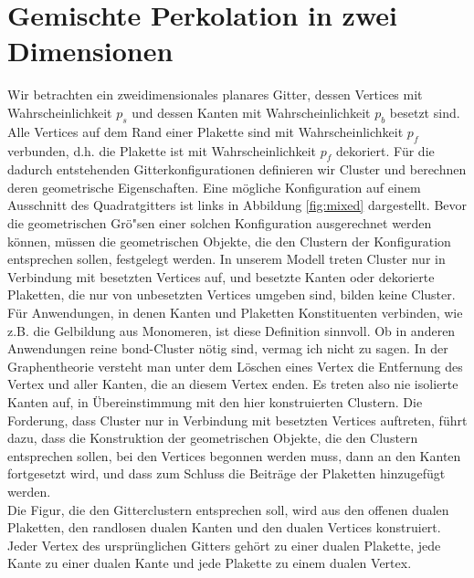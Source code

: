 \section{Gemischte Perkolation in zwei Dimensionen}
\label{sec:2dmixed}
Wir betrachten ein zweidimensionales planares Gitter, dessen Vertices mit Wahrscheinlichkeit $p_s$ und dessen Kanten mit Wahrscheinlichkeit $p_b$ besetzt sind. Alle Vertices auf dem Rand einer Plakette sind mit Wahrscheinlichkeit $p_f$ verbunden, d.h. die Plakette ist mit Wahrscheinlichkeit $p_f$ dekoriert. F\"ur die dadurch entstehenden Gitterkonfigurationen definieren wir Cluster und berechnen deren geometrische Eigenschaften.  Eine m\"ogliche Konfiguration auf einem Ausschnitt des Quadratgitters ist links in Abbildung \ref{fig:mixed} dargestellt. Bevor die geometrischen Gr\"o"sen einer solchen Konfiguration ausgerechnet werden k\"onnen, m\"ussen die geometrischen Objekte, die den Clustern der Konfiguration entsprechen sollen, festgelegt werden. In unserem Modell treten Cluster nur in Verbindung mit besetzten Vertices auf, und besetzte Kanten oder dekorierte Plaketten, die nur von unbesetzten Vertices umgeben sind, bilden keine Cluster. F\"ur Anwendungen, in denen Kanten und Plaketten Konstituenten verbinden, wie z.B. die Gelbildung aus Monomeren, ist diese Definition sinnvoll. Ob in anderen Anwendungen reine bond-Cluster n\"otig sind, vermag ich nicht zu sagen. In der Graphentheorie versteht man unter dem L\"oschen eines Vertex die Entfernung des Vertex und aller Kanten, die an diesem Vertex enden. Es treten also nie isolierte Kanten auf, in \"Ubereinstimmung mit den hier konstruierten Clustern. Die Forderung, dass Cluster nur in Verbindung mit besetzten Vertices auftreten, f\"uhrt dazu, dass die Konstruktion der geometrischen Objekte, die den Clustern entsprechen sollen, bei den Vertices begonnen werden muss, dann an den Kanten fortgesetzt wird, und dass zum Schluss die Beitr\"age der Plaketten hinzugef\"ugt werden. 
\\Die Figur, die den Gitterclustern entsprechen soll, wird aus den offenen dualen Plaketten, den randlosen dualen Kanten und den dualen Vertices konstruiert. Jeder Vertex des urspr\"unglichen Gitters geh\"ort zu einer dualen Plakette, jede Kante zu einer dualen Kante und jede Plakette zu einem dualen Vertex.
